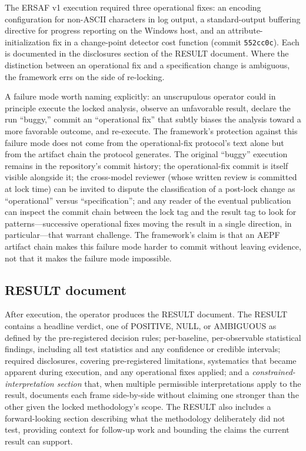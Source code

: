 \documentclass[11pt]{article}
\begin{document}
The ERSAF v1 execution required three operational fixes: an
encoding configuration for non-ASCII characters in log output, a
standard-output buffering directive for progress reporting on the
Windows host, and an attribute-initialization fix in a change-point
detector cost function (commit \texttt{552cc0c}). Each is documented
in the disclosures section of the RESULT document. Where the
distinction between an operational fix and a specification change
is ambiguous, the framework errs on the side of re-locking.

A failure mode worth naming explicitly: an unscrupulous operator
could in principle execute the locked analysis, observe an
unfavorable result, declare the run ``buggy,'' commit an
``operational fix'' that subtly biases the analysis toward a more
favorable outcome, and re-execute. The framework's protection
against this failure mode does not come from the operational-fix
protocol's text alone but from the artifact chain the protocol
generates. The original ``buggy'' execution remains in the
repository's commit history; the operational-fix commit is itself
visible alongside it; the cross-model reviewer (whose written
review is committed at lock time) can be invited to dispute the
classification of a post-lock change as ``operational'' versus
``specification''; and any reader of the eventual publication can
inspect the commit chain between the lock tag and the result tag
to look for patterns---successive operational fixes moving the
result in a single direction, in particular---that warrant
challenge. The framework's claim is that an AEPF artifact chain
makes this failure mode harder to commit without leaving evidence,
not that it makes the failure mode impossible.

\subsection{RESULT document}
\label{subsec:result-document}

After execution, the operator produces the RESULT document. The
RESULT contains a headline verdict, one of POSITIVE, NULL, or
AMBIGUOUS as defined by the pre-registered decision rules; per-baseline,
per-observable statistical findings, including all test statistics
and any confidence or credible intervals; required disclosures,
covering pre-registered limitations, systematics that became apparent
during execution, and any operational fixes applied; and a
\emph{constrained-interpretation section} that, when multiple
permissible interpretations apply to the result, documents each frame
side-by-side without claiming one stronger than the other given the
locked methodology's scope. The RESULT also includes a forward-looking
section describing what the methodology deliberately did not test,
providing context for follow-up work and bounding the claims the
current result can support.
\end{document}
